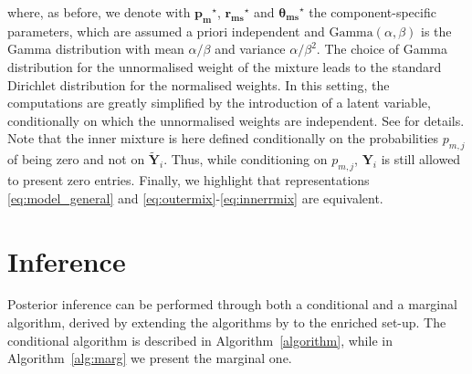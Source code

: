 \documentclass[11pt]{article}
\begin{document}
where, as before, we denote with $\bm{p_m}^{\star}$, $\bm{r_{ms}}^{\star}$ and $\bm{\theta_{ms}}^{\star}$ the component-specific parameters, which are assumed a priori independent and $\text{Gamma}\left(\alpha,\beta\right)$ is the Gamma distribution with mean $\alpha/\beta$ and variance $\alpha/\beta^2$. The choice of Gamma distribution for the unnormalised weight of the mixture  leads to the standard Dirichlet distribution for the normalised weights. In this setting, the computations are greatly simplified by the introduction of a latent variable, conditionally on which the unnormalised weights are independent. See \citet{Argiento2022} for details. Note that the inner mixture is here defined conditionally on the probabilities $p_{m,j}$ of being zero and not on $\tilde{\bm{Y}}_{i}$. Thus, while conditioning on $p_{m,j}$, $\bm{Y}_i$ is still allowed to present zero entries. Finally, we highlight that representations \eqref{eq:model_general} and \eqref{eq:outermix}-\eqref{eq:innerrmix} are equivalent. 

\section{Inference}\label{sec:Inference}
Posterior inference can be performed through both a conditional and a marginal algorithm, derived by extending the algorithms by \citet{Argiento2022} to the enriched set-up. The conditional algorithm is described in Algorithm~\ref{algorithm}, while in Algorithm~\ref{alg:marg} we present the marginal one.
\end{document}
